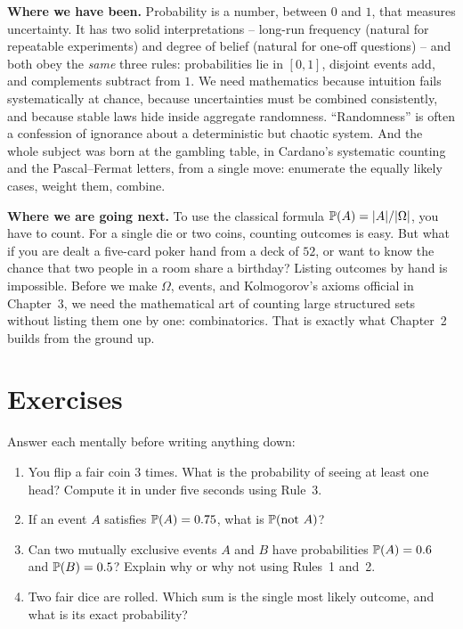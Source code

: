 \begin{recoverybox}
\textbf{Where we have been.} Probability is a number, between $0$ and $1$, that
measures uncertainty. It has two solid interpretations -- long-run frequency
(natural for repeatable experiments) and degree of belief (natural for one-off
questions) -- and both obey the \emph{same} three rules: probabilities
lie in $[0,1]$, disjoint events add, and complements subtract from $1$. We need
mathematics because intuition fails systematically at chance, because uncertainties
must be combined consistently, and because stable laws hide inside aggregate
randomness. ``Randomness'' is often a confession of ignorance about a deterministic
but chaotic system. And the whole subject was born at the gambling table, in
Cardano's systematic counting and the Pascal--Fermat letters, from a single move:
enumerate the equally likely cases, weight them, combine.

\textbf{Where we are going next.} To use the classical formula $\P(A) = \abs{A}/\abs{\Omega}$, you have to count. For a single die or two coins, counting outcomes is easy. But what if you are dealt a five-card poker hand from a deck of $52$, or want to know the chance that two people in a room share a birthday? Listing outcomes by hand is impossible. Before we make $\Omega$, events, and Kolmogorov's axioms official in Chapter~3, we need the mathematical art of counting large structured sets without listing them one by one: combinatorics. That is exactly what Chapter~2 builds from the ground up.
\end{recoverybox}

\section{Exercises}
\label{ch01:exercises}

\begin{exercise}
\label{ch01:ex-mental}
Answer each mentally before writing anything down:
\begin{enumerate}
\item You flip a fair coin $3$ times. What is the probability of seeing at least
one head? Compute it in under five seconds using Rule~3.
\item If an event $A$ satisfies $\P(A) = 0.75$, what is $\P(\text{not } A)$?
\item Can two mutually exclusive events $A$ and $B$ have probabilities $\P(A) = 0.6$
and $\P(B) = 0.5$? Explain why or why not using Rules~1 and~2.
\item Two fair dice are rolled. Which sum is the single most likely outcome, and
what is its exact probability?
\end{enumerate}
\end{exercise}

